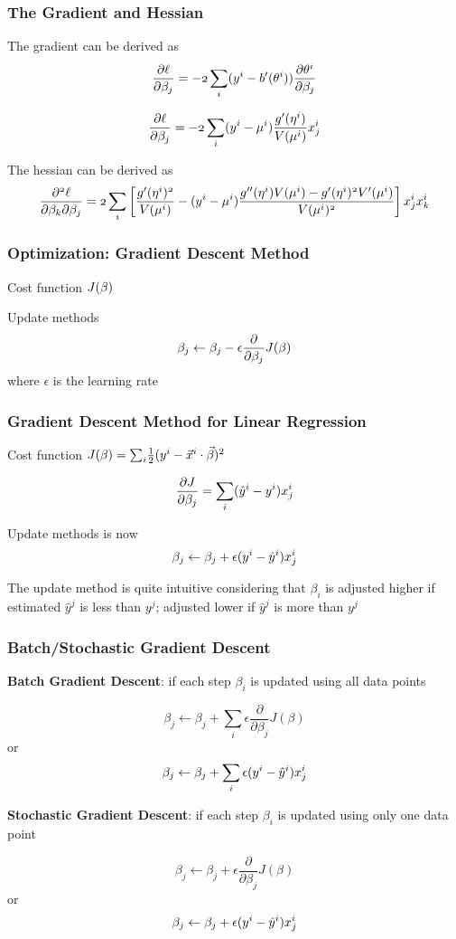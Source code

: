 \documentclass[notheorems, aspectratio=54]{beamer}
\begin{document}
\begin{frame}
\frametitle{The Gradient and Hessian}
The gradient can be derived as
$$\mathnormal{\frac{\partial \ell}{\partial \beta_j}}=\mathnormal{-2\sum_i(y^i-b'(\theta^i))\frac{\partial\theta^i}{\partial\beta_j}}$$

$$\mathnormal{\frac{\partial \ell}{\partial \beta_j}}=\mathnormal{-2\sum_i(y^i-\mu^i)\frac{g'(\eta^i)}{V(\mu^i)}x_j^i}$$

The hessian can be derived as
$$\mathnormal{\frac{\partial^2 \ell}{\partial \beta_k\partial \beta_j}=2\sum_i\left[\frac{g'(\eta^i)^2}{V(\mu^i)}-(y^i-\mu^i)\frac{g''(\eta^i)V(\mu^i)-g'(\eta^i)^2V'(\mu^i)}{V(\mu^i)^2}\right]x_j^ix_k^i}$$
\end{frame}


\begin{frame}

\frametitle{Optimization: Gradient Descent Method}
Cost function $\mathnormal{J(\beta)}$

Update methods
$$\mathnormal{\beta_j\leftarrow \beta_j-\epsilon\frac{\partial}{\partial\beta_j}J(\beta)}$$
where $\epsilon$ is the learning rate
\end{frame}	


\begin{frame}

\frametitle{Gradient Descent Method for Linear Regression}
Cost function $\mathnormal{J(\beta)}=\mathnormal{\sum_i}{\frac{1}{2}(\mathnormal{y}^i-\vec{\mathnormal{x}}^i\cdot\vec{\beta})^2}$

$$\mathnormal{\frac{\partial J}{\partial \beta_j}}={\sum_i(\hat{\mathnormal{y}}^i-\mathnormal{y}^i)\mathnormal{x}_j^i}$$

Update methods is now
$$\beta_j\leftarrow \beta_j+\epsilon(\mathnormal{y}^i-\hat{\mathnormal{y}}^i)\mathnormal{x}_j^i$$

The update method is quite intuitive considering that $\beta_i$ is adjusted higher if estimated $\hat{y}^j$ is less than $y^j$; adjusted lower if $\hat{y}^j$ is more than $y^j$

\end{frame}	


\begin{frame}

\frametitle{Batch/Stochastic Gradient Descent}
\textbf{Batch Gradient Descent}: if each step $\beta_i$ is updated using all data points

$$\beta_j\leftarrow \beta_j+\sum_i\epsilon\frac{\partial}{\partial\beta_j}J(\beta)$$ or
$$\beta_j\leftarrow \beta_j+\sum_i\epsilon(\mathnormal{y}^i-\hat{\mathnormal{y}}^i)\mathnormal{x}_j^i$$


\textbf{Stochastic Gradient Descent}: if each step $\beta_i$ is updated using only one data point

$$\beta_j\leftarrow \beta_j+\epsilon\frac{\partial}{\partial\beta_j}J(\beta)$$ or
$$\beta_j\leftarrow \beta_j+\epsilon(y^i-\hat{y}^i)\mathnormal{x}_j^i$$


\end{frame}	
\end{document}
